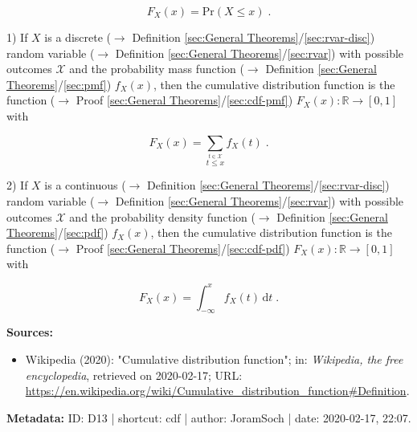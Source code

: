 \documentclass[a4paper,12pt,twoside]{book}
\begin{document}
\begin{equation} \label{eq:cdf-cdf}
F_X(x) = \mathrm{Pr}(X \leq x) \; .
\end{equation}

\vspace{1em}
1) If $X$ is a discrete ($\rightarrow$ Definition \ref{sec:General Theorems}/\ref{sec:rvar-disc}) random variable ($\rightarrow$ Definition \ref{sec:General Theorems}/\ref{sec:rvar}) with possible outcomes $\mathcal{X}$ and the probability mass function ($\rightarrow$ Definition \ref{sec:General Theorems}/\ref{sec:pmf}) $f_X(x)$, then the cumulative distribution function is the function ($\rightarrow$ Proof \ref{sec:General Theorems}/\ref{sec:cdf-pmf}) $F_X(x): \mathbb{R} \to [0,1]$ with

\begin{equation} \label{eq:cdf-cdf-disc}
F_X(x) = \sum_{\overset{t \in \mathcal{X}}{t \leq x}} f_X(t) \; .
\end{equation}

\vspace{1em}
2) If $X$ is a continuous ($\rightarrow$ Definition \ref{sec:General Theorems}/\ref{sec:rvar-disc}) random variable ($\rightarrow$ Definition \ref{sec:General Theorems}/\ref{sec:rvar}) with possible outcomes $\mathcal{X}$ and the probability density function ($\rightarrow$ Definition \ref{sec:General Theorems}/\ref{sec:pdf}) $f_X(x)$, then the cumulative distribution function is the function ($\rightarrow$ Proof \ref{sec:General Theorems}/\ref{sec:cdf-pdf}) $F_X(x): \mathbb{R} \to [0,1]$ with

\begin{equation} \label{eq:cdf-cdf-cont}
F_X(x) = \int_{-\infty}^{x} f_X(t) \, \mathrm{d}t \; .
\end{equation}


\vspace{1em}
\textbf{Sources:}
\begin{itemize}
\item Wikipedia (2020): "Cumulative distribution function"; in: \textit{Wikipedia, the free encyclopedia}, retrieved on 2020-02-17; URL: \url{https://en.wikipedia.org/wiki/Cumulative_distribution_function#Definition}.
\end{itemize}


\vspace{1em}
\textbf{Metadata:} ID: D13 | shortcut: cdf | author: JoramSoch | date: 2020-02-17, 22:07.
\vspace{1em}
\end{document}
